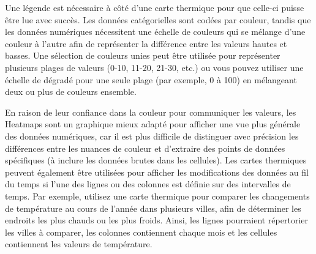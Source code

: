 \documentclass[french, a4paper, 12pt]{report}
\begin{document}
Une légende est nécessaire à côté d’une carte thermique pour que celle-ci puisse être lue avec succès. Les données catégorielles sont codées par couleur, tandis que les données numériques nécessitent une échelle de couleurs qui se mélange d'une couleur à l'autre afin de représenter la différence entre les valeurs hautes et basses. Une sélection de couleurs unies peut être utilisée pour représenter plusieurs plages de valeurs (0-10, 11-20, 21-30, etc.) ou vous pouvez utiliser une échelle de dégradé pour une seule plage (par exemple, 0 à 100) en mélangeant deux ou plus de couleurs ensemble.

En raison de leur confiance dans la couleur pour communiquer les valeurs, les Heatmaps sont un graphique mieux adapté pour afficher une vue plus générale des données numériques, car il est plus difficile de distinguer avec précision les différences entre les nuances de couleur et d’extraire des points de données spécifiques (à inclure les données brutes dans les cellules).
Les cartes thermiques peuvent également être utilisées pour afficher les modifications des données au fil du temps si l'une des lignes ou des colonnes est définie sur des intervalles de temps. Par exemple, utilisez une carte thermique pour comparer les changements de température au cours de l’année dans plusieurs villes, afin de déterminer les endroits les plus chauds ou les plus froids. Ainsi, les lignes pourraient répertorier les villes à comparer, les colonnes contiennent chaque mois et les cellules contiennent les valeurs de température.
\end{document}
